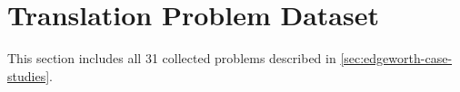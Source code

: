 \chapter{\Edgeworth{} Translation Problem Dataset}
\label{app:translation-problem-dataset}

This section includes all 31 collected problems described in \cref{sec:edgeworth-case-studies}.















